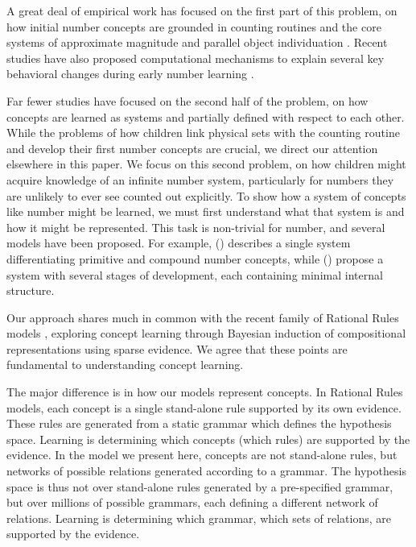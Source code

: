 \documentclass[10pt,letterpaper]{article}
\begin{document}
A great deal of empirical work has focused on the first part of this
problem, on how initial number concepts are grounded in counting
routines and the core systems of approximate magnitude and parallel
object individuation
\citep{Car2009,dehaene2011number,feigenson2004core}. Recent studies
have also proposed computational mechanisms to explain several key
behavioral changes during early number learning
\citep{PianGoodTen2012}.

Far fewer studies have focused on the second half of the problem, on
how concepts are learned as systems and partially defined with respect
to each other. While the problems of how children link physical sets
with the counting routine and develop their first number concepts are
crucial, we direct our attention elsewhere in this paper. We focus on
this second problem, on how children might acquire knowledge of an
infinite number system, particularly for numbers they are unlikely to
ever see counted out explicitly. To show how a system of concepts like
number might be learned, we must first understand what that system is
and how it might be represented. This task is non-trivial for number,
and several models have been proposed. For example,
\citeauthor{hurford1975linguistic} (\citeyear{hurford1975linguistic})
describes a single system differentiating primitive and compound
number concepts, while \citeauthor{siegler1982development}
(\citeyear{siegler1982development}) propose a system with several
stages of development, each containing minimal internal structure.


Our approach shares much in common with the recent family of Rational
Rules models
\citep{goodman2008rational,T.D.Ullman:2012:1b1b6,PianGoodTen2012},
exploring concept learning through Bayesian induction of compositional
representations using sparse evidence. We agree that these points are
fundamental to understanding concept learning.

The major difference is in how our models represent concepts. In
Rational Rules models, each concept is a single stand-alone rule
supported by its own evidence. These rules are generated from a static
grammar which defines the hypothesis space. Learning is determining
which concepts (which rules) are supported by the evidence. In the
model we present here, concepts are not stand-alone rules, but
networks of possible relations generated according to a grammar. The
hypothesis space is thus not over stand-alone rules generated by a
pre-specified grammar, but over millions of possible grammars, each
defining a different network of relations. Learning is determining
which grammar, which sets of relations, are supported by the evidence.
\end{document}
